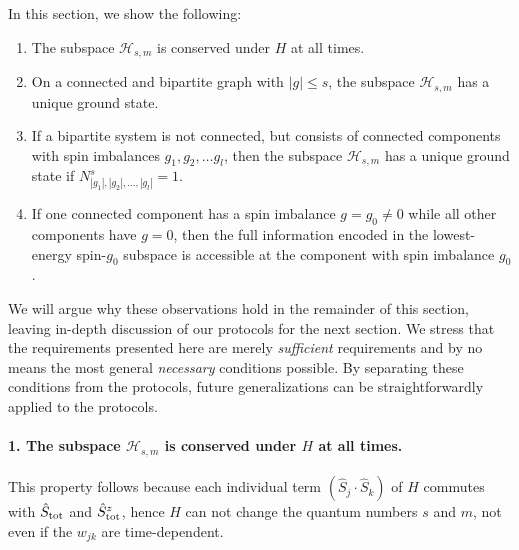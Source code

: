In this section, we show the following:
\begin{enumerate}
\item The subspace $\mathcal{H}_{s,m}$ is conserved under $H$ at all times.
\item On a connected and bipartite graph with $|g| \leq s$, the subspace $\mathcal{H}_{s,m}$ has a unique ground state. 
\item If a bipartite system is not connected, but consists of connected components with spin imbalances $g_1, g_2, \ldots g_l$, then the subspace $\mathcal{H}_{s,m}$ has a unique ground state if $N_{|g_1|, |g_2|, \ldots, |g_l|}^s = 1$.
\item If one connected component has a spin imbalance $g = g_0 \neq 0$ while all other components have $g=0$, then the full information encoded in the lowest-energy spin-$g_0$ subspace is accessible at the component with spin imbalance $g_0$.
\end{enumerate}
We will argue why these observations hold in the remainder of this section, leaving in-depth discussion of our protocols for the next section. We stress that the requirements presented here are merely \emph{sufficient} requirements and by no means the most general \emph{necessary} conditions possible. By separating these conditions from the protocols, future generalizations can be straightforwardly applied to the protocols.


\paragraph{1. The subspace $\mathcal{H}_{s,m}$ is conserved under $H$ at all times.}
This property follows because each individual term $(\hat{S}_j \cdot \hat{S}_k)$ of $H$ commutes with ${\hat{S}_\text{tot}}$ and ${\hat{S}^z_\text{tot}}$, hence $H$ can not change the quantum numbers $s$ and $m$, not even if the $w_{jk}$ are time-dependent.

